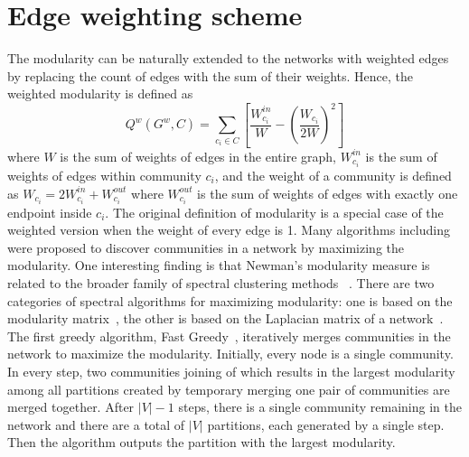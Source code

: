 \section{Edge weighting scheme} \label{sec:2.6}
The modularity can be naturally extended to the networks with weighted edges by replacing the count of edges with the sum of their weights. Hence, the weighted modularity is defined as
\begin{equation} \label{eq:definition_weight}
    Q^{w}(G^w, C) = \sum_{c_i \in C} \left[ \frac{W_{c_i}^{in} }{ W } - \left( \frac{W_{c_i}}{ 2 W}\right)^2 \right]
\end{equation}
where $W$ is the sum of weights of edges in the entire graph, $W_{c_i}^{in}$ is the sum of weights of edges within community $c_i$, and the weight of a community is defined as $W_{c_i} = 2W_{c_i}^{in} + W_{c_i}^{out}$ where $W_{c_i}^{out}$ is the sum of weights of edges with exactly one endpoint inside $c_i$. The original definition of modularity is a special case of the weighted version when the weight of every edge is 1.
Many algorithms including~\cite{blondel2008fast,clauset2004finding,newman2004fast,newman2013spectral,sales2007extracting,white2005spectral} were proposed to discover communities in a network by maximizing the modularity. One interesting finding is that Newman's modularity measure is related to the broader family of spectral clustering methods ~\cite{white2005spectral}. There are two categories of spectral algorithms for maximizing modularity: one is based on the modularity matrix~\cite{newman2006finding,newman2006modularity,richardson2009spectral}, the other is based on the Laplacian matrix of a network~\cite{white2005spectral,ruan2008identifying}. The first greedy algorithm, Fast Greedy~\cite{clauset2004finding}, iteratively merges communities in the network to maximize the modularity. Initially, every node is a single community. In every step, two communities joining of which results in the largest modularity among all partitions created by temporary merging one pair of communities are merged together. After $|V|-1$ steps, there is a single community remaining in the network and there are a total of
$|V|$ partitions, each generated by a single step. Then the algorithm outputs the partition with the largest modularity. 
